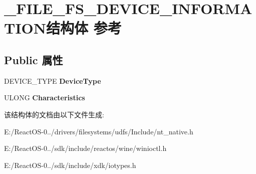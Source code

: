 \hypertarget{struct___f_i_l_e___f_s___d_e_v_i_c_e___i_n_f_o_r_m_a_t_i_o_n}{}\section{\+\_\+\+F\+I\+L\+E\+\_\+\+F\+S\+\_\+\+D\+E\+V\+I\+C\+E\+\_\+\+I\+N\+F\+O\+R\+M\+A\+T\+I\+O\+N结构体 参考}
\label{struct___f_i_l_e___f_s___d_e_v_i_c_e___i_n_f_o_r_m_a_t_i_o_n}
\subsection*{Public 属性}
\begin{DoxyCompactItemize}
\item 
\mbox{\label{struct___f_i_l_e___f_s___d_e_v_i_c_e___i_n_f_o_r_m_a_t_i_o_n_a8b2318e668cbbad8ba14bcee074e2d5d}} 
D\+E\+V\+I\+C\+E\+\_\+\+T\+Y\+PE {\bfseries Device\+Type}
\item 
\mbox{\label{struct___f_i_l_e___f_s___d_e_v_i_c_e___i_n_f_o_r_m_a_t_i_o_n_aac1d827c2d4a833f699dc8dfab10437a}} 
U\+L\+O\+NG {\bfseries Characteristics}
\end{DoxyCompactItemize}


该结构体的文档由以下文件生成\+:\begin{DoxyCompactItemize}
\item 
E\+:/\+React\+O\+S-\/0../drivers/filesystems/udfs/\+Include/nt\+\_\+native.\+h\item 
E\+:/\+React\+O\+S-\/0../sdk/include/reactos/wine/winioctl.\+h\item 
E\+:/\+React\+O\+S-\/0../sdk/include/xdk/iotypes.\+h\end{DoxyCompactItemize}
